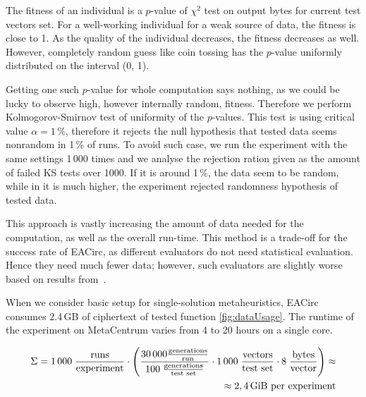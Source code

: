 \documentclass[
  print, %
  Table,   %
  nolof,     %
  nolot,     %
  11pt, %
  oneside  %
]{fithesis3}
\begin{document}
The fitness of an individual is a $p$-value of $\chi^{2}$ test on output bytes for current test vectors set. For a well-working individual for a weak source of data, the fitness is close to 1. As the quality of the individual decreases, the fitness decreases as well. However, completely random guess like coin tossing has the $p$-value uniformly distributed on the interval (0, 1).

Getting one such $p$-value for whole computation says nothing, as we could be lucky to observe high, however internally random, fitness. Therefore we perform Kolmogorov-Smirnov test of uniformity of the $p$-values. This test is using critical value $\alpha = 1\,\%$, therefore it rejects the null hypothesis that tested data seems nonrandom in 1\,\% of runs. To avoid such case, we run the experiment with the same settings 1\,000 times and we analyse the rejection ration given as the amount of failed KS tests over 1000. If it is around 1\,\%, the data seem to be random, while in it is much higher, the experiment rejected randomness hypothesis of tested data.

This approach is vastly increasing the amount of data needed for the computation, as well as the overall run-time. This method is a trade-off for the success rate of EACirc, as different evaluators do not need statistical evaluation. Hence they need much fewer data; however, such evaluators are slightly worse based on results from~\cite{svenda2013towards}.

When we consider basic setup for single-solution metaheuristics, EACirc consumes 2.4\,GB of ciphertext of tested function \cref{fig:dataUsage}. The runtime of the experiment on MetaCentrum varies from 4 to 20 hours on a single core.

\begin{figure*}[t]
    \begin{equation*}
        \begin{aligned}
    \Sigma = 1\,000 \;
             \frac{\textnormal{runs}}
                  {\textnormal{experiment}}
             \cdot
             \left(
             \frac{30\,000 \frac{\textnormal{generations}}{\textnormal{run}}}
                  {100 \; \frac{\textnormal{generations}}{\textnormal{test set}}}
             \cdot
             1\,000 \;
             \frac{\textnormal{vectors}}
                  {\textnormal{test set}}
             \cdot
             8 \;
             \frac{\textnormal{bytes}}
                  {\textnormal{vector}}
             \right) \approx\\
             \approx 2,4 \textnormal{\,GiB per experiment}
        \end{aligned}
    \end{equation*}
    \caption{The amount of data analyzed by EACirc for a single configuration of randomness testing experiment.}
    \label{fig:dataUsage}
\end{figure*}
\end{document}
